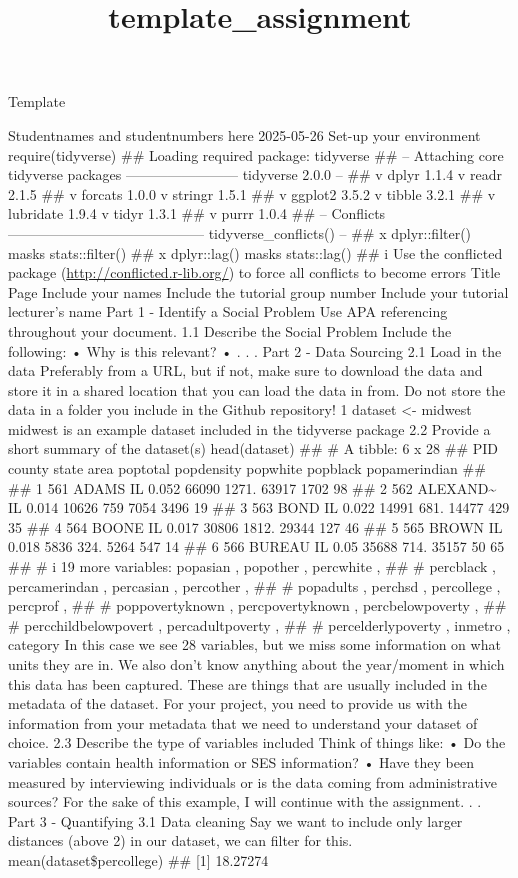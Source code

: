 \documentclass[
]{article}
\title{template\_assignment}
\author{}
\date{\vspace{-2.5em}}
\begin{document}
\maketitle

Template

Studentnames and studentnumbers here 2025-05-26 Set-up your environment
require(tidyverse) \#\# Loading required package: tidyverse \#\# --
Attaching core tidyverse packages ------------------------ tidyverse
2.0.0 -- \#\# v dplyr 1.1.4 v readr 2.1.5 \#\# v forcats 1.0.0 v stringr
1.5.1 \#\# v ggplot2 3.5.2 v tibble 3.2.1 \#\# v lubridate 1.9.4 v tidyr
1.3.1 \#\# v purrr 1.0.4 \#\# -- Conflicts
------------------------------------------ tidyverse\_conflicts() --
\#\# x dplyr::filter() masks stats::filter() \#\# x dplyr::lag() masks
stats::lag() \#\# i Use the conflicted package
(\url{http://conflicted.r-lib.org/}) to force all conflicts to become
errors Title Page Include your names Include the tutorial group number
Include your tutorial lecturer's name Part 1 - Identify a Social Problem
Use APA referencing throughout your document. 1.1 Describe the Social
Problem Include the following: • Why is this relevant? • . . . Part 2 -
Data Sourcing 2.1 Load in the data Preferably from a URL, but if not,
make sure to download the data and store it in a shared location that
you can load the data in from. Do not store the data in a folder you
include in the Github repository! 1 dataset \textless- midwest midwest
is an example dataset included in the tidyverse package 2.2 Provide a
short summary of the dataset(s) head(dataset) \#\# \# A tibble: 6 x 28
\#\# PID county state area poptotal popdensity popwhite popblack
popamerindian \#\# \#\# 1 561 ADAMS IL 0.052 66090 1271. 63917 1702 98
\#\# 2 562 ALEXAND\textasciitilde{} IL 0.014 10626 759 7054 3496 19 \#\#
3 563 BOND IL 0.022 14991 681. 14477 429 35 \#\# 4 564 BOONE IL 0.017
30806 1812. 29344 127 46 \#\# 5 565 BROWN IL 0.018 5836 324. 5264 547 14
\#\# 6 566 BUREAU IL 0.05 35688 714. 35157 50 65 \#\# \# i 19 more
variables: popasian , popother , percwhite , \#\# \# percblack ,
percamerindan , percasian , percother , \#\# \# popadults , perchsd ,
percollege , percprof , \#\# \# poppovertyknown , percpovertyknown ,
percbelowpoverty , \#\# \# percchildbelowpovert , percadultpoverty ,
\#\# \# percelderlypoverty , inmetro , category In this case we see 28
variables, but we miss some information on what units they are in. We
also don't know anything about the year/moment in which this data has
been captured. These are things that are usually included in the
metadata of the dataset. For your project, you need to provide us with
the information from your metadata that we need to understand your
dataset of choice. 2.3 Describe the type of variables included Think of
things like: • Do the variables contain health information or SES
information? • Have they been measured by interviewing individuals or is
the data coming from administrative sources? For the sake of this
example, I will continue with the assignment. . . Part 3 - Quantifying
3.1 Data cleaning Say we want to include only larger distances (above 2)
in our dataset, we can filter for this. mean(dataset\$percollege) \#\#
{[}1{]} 18.27274
\end{document}
